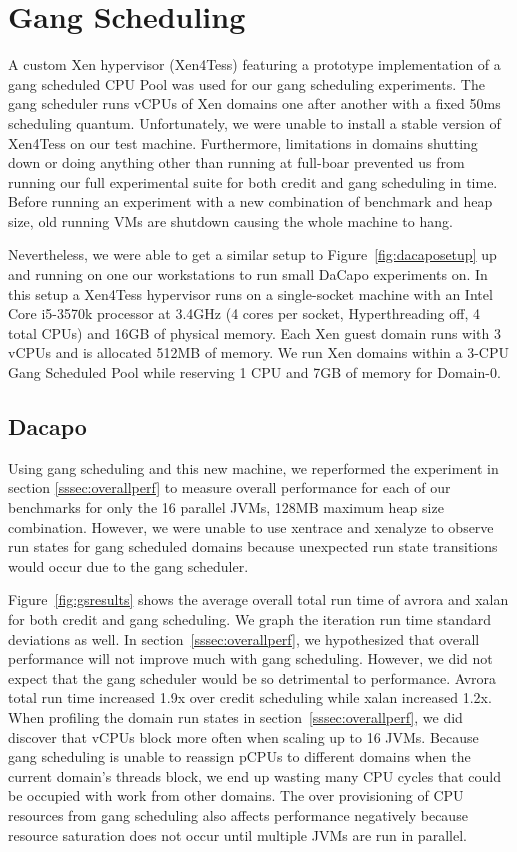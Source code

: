 \documentclass{sig-alternate}
\begin{document}
\section{Gang Scheduling} \label{sec:gs}
A custom Xen hypervisor (Xen4Tess) featuring a prototype implementation of a gang scheduled CPU Pool was used for our gang scheduling experiments. The gang scheduler runs vCPUs of Xen domains one after another with a fixed 50ms scheduling quantum. Unfortunately, we were unable to install a stable version of Xen4Tess on our test machine. Furthermore, limitations in domains shutting down or doing anything other than running at full-boar prevented us from running our full experimental suite for both credit and gang scheduling in time. Before running an experiment with a new combination of benchmark and heap size, old running VMs are shutdown causing the whole machine to hang.

Nevertheless, we were able to get a similar setup to Figure~\ref{fig:dacaposetup} up and running on one our workstations to run small DaCapo experiments on. In this setup a Xen4Tess hypervisor runs on a single-socket machine with an Intel Core i5-3570k processor at 3.4GHz (4 cores per socket, Hyperthreading off,  4 total CPUs) and 16GB of physical memory. Each Xen guest domain runs with 3 vCPUs and is allocated 512MB of memory. We run Xen domains within a 3-CPU Gang Scheduled Pool while reserving 1 CPU and 7GB of memory for Domain-0.

\subsection{Dacapo}
Using gang scheduling and this new machine, we reperformed the experiment in section \ref{sssec:overallperf} to measure overall performance for each of our benchmarks for only the 16 parallel JVMs, 128MB maximum heap size combination. However, we were unable to use xentrace and xenalyze to observe run states for gang scheduled domains because unexpected run state transitions would occur due to the gang scheduler.

Figure~\ref{fig:gsresults} shows the average overall total run time of avrora and xalan for both credit and gang scheduling. We graph the iteration run time standard deviations as well. In section~\ref{sssec:overallperf}, we hypothesized that overall performance will not improve much with gang scheduling. However, we did not expect that the gang scheduler would be so detrimental to performance. Avrora total run time increased 1.9x over credit scheduling while xalan increased 1.2x. When profiling the domain run states in section~\ref{sssec:overallperf}, we did discover that vCPUs block more often when scaling up to 16 JVMs. Because gang scheduling is unable to reassign pCPUs to different domains when the current domain's threads block, we end up wasting many CPU cycles that could be occupied with work from other domains. The over provisioning of CPU resources from gang scheduling also affects performance negatively because resource saturation does not occur until multiple JVMs are run in parallel.
\end{document}
